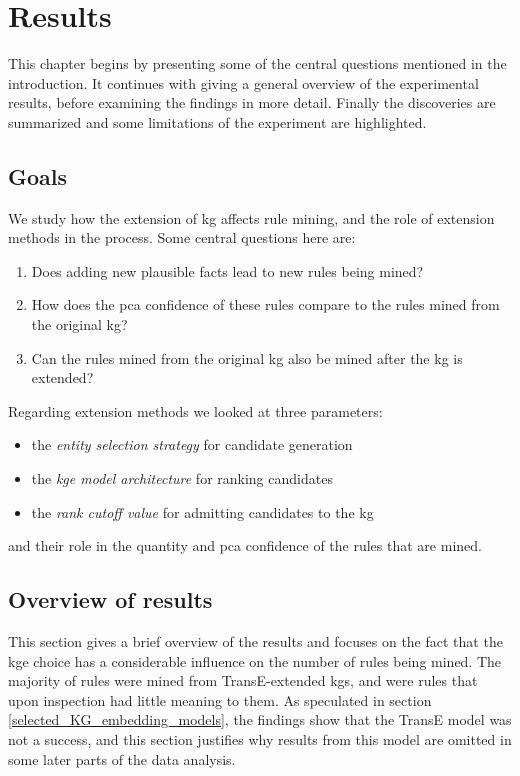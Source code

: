 \chapter{Results}
This chapter begins by presenting some of the central questions mentioned in the introduction. It continues with giving a general overview of the experimental results, before examining the findings in more detail. Finally the discoveries are summarized and some limitations of the experiment are highlighted.

\section{Goals}
We study how the extension of \gls{kg} affects rule mining, and the role of extension methods in the process. Some central questions here are:
\begin{enumerate}
    \item Does adding new plausible facts lead to new rules being mined? 
    \item How does the \gls{pca} confidence of these rules compare to the rules mined from the original \gls{kg}?
    \item Can the rules mined from the original \gls{kg} also be mined after the \gls{kg} is extended?
\end{enumerate}
Regarding extension methods we looked at three parameters:
\begin{itemize}
    \item the \textit{entity selection strategy} for candidate generation
    \item the \textit{\gls{kge} model architecture} for ranking candidates
    \item the \textit{rank cutoff value} for admitting candidates to the \gls{kg}
\end{itemize}
and their role in the quantity and \gls{pca} confidence of the rules that are mined.

\section{Overview of results}
This section gives a brief overview of the results and focuses on the fact that the \gls{kge} choice has a considerable influence on the number of rules being mined. The majority of rules were mined from TransE-extended \glspl{kg}, and were rules that upon inspection had little meaning to them. As speculated in section \ref{selected_KG_embedding_models}, the findings show that the TransE model was not a success, and this section justifies why results from this model are omitted in some later parts of the data analysis.

